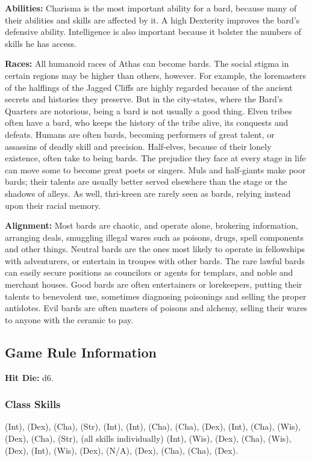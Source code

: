 \textbf{Abilities:} Charisma is the most important ability for a bard, because many of their abilities and skills are affected by it. A high Dexterity improves the bard's defensive ability. Intelligence is also important because it bolster the numbers of skills he has access.

\textbf{Races:} All humanoid races of Athas can become bards. The social stigma in certain regions may be higher than others, however. For example, the loremasters of the halflings of the Jagged Cliffs are highly regarded because of the ancient secrets and histories they preserve. But in the city-states, where the Bard's Quarters are notorious, being a bard is not usually a good thing. Elven tribes often have a bard, who keeps the history of the tribe alive, its conquests and defeats. Humans are often bards, becoming performers of great talent, or assassins of deadly skill and precision. Half-elves, because of their lonely existence, often take to being bards. The prejudice they face at every stage in life can move some to become great poets or singers. Muls and half-giants make poor bards; their talents are usually better served elsewhere than the stage or the shadows of alleys. As well, thri-kreen are rarely seen as bards, relying instead upon their racial memory.

\textbf{Alignment:} Most bards are chaotic, and operate alone, brokering information, arranging deals, smuggling illegal wares such as poisons, drugs, spell components and other things. Neutral bards are the ones most likely to operate in fellowships with adventurers, or entertain in troupes with other bards. The rare lawful bards can easily secure positions as councilors or agents for templars, and noble and merchant houses. Good bards are often entertainers or lorekeepers, putting their talents to benevolent use, sometimes diagnosing poisonings and selling the proper antidotes. Evil bards are often masters of poisons and alchemy, selling their wares to anyone with the ceramic to pay.

\subsection{Game Rule Information}

\textbf{Hit Die:} d6.

\subsubsection{Class Skills}
 (Int),  (Dex),  (Cha),  (Str),  (Int),  (Int),  (Cha),  (Cha),  (Dex),  (Int),  (Cha),  (Wis),  (Dex),  (Cha),  (Str),  (all skills individually) (Int),  (Wis),  (Dex),  (Cha),  (Wis),  (Dex),  (Int),  (Wis),  (Dex),  (N/A),  (Dex),  (Cha),  (Cha),  (Dex).

